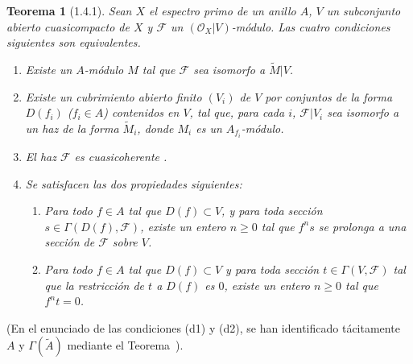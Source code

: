 \documentclass[oneside]{amsart}
\theoremstyle{ega-env-style}
\theoremstyle{ega-thm-env-style}
\newtheorem*{theorem}{Teorema}
\theoremstyle{ega-defn-env-style}
\def\geq{\geqslant}                 %
\let\EGAOriginalLabel\label
\renewcommand{\label}[1]{\phantomsection\EGAOriginalLabel{#1}}
\begin{document}
\begin{theorem}[1.4.1]
\label{I.1.4.1}
Sean $X$ el espectro primo de un anillo $A$, $V$ un subconjunto abierto cuasicompacto de $X$ y $\mathscr{F}$ un $(\mathscr{O}_X|V)$-módulo.
Las cuatro condiciones siguientes son equivalentes.
\begin{enumerate}
  \item[\textup{a)}] Existe un $A$-módulo $M$ tal que $\mathscr{F}$ sea isomorfo a $\widetilde{M}|V$.
  \item[\textup{b)}] Existe un cubrimiento abierto finito $(V_i)$ de $V$ por conjuntos de la forma $D(f_i)$ ($f_i\in A$) contenidos en $V$, tal que, para cada $i$, $\mathscr{F}|V_i$ sea isomorfo a un haz de la forma $\widetilde{M}_i$, donde $M_i$ es un $A_{f_i}$-módulo.
  \item[\textup{c)}] El haz $\mathscr{F}$ es cuasicoherente .
  \item[\textup{d)}] Se satisfacen las dos propiedades siguientes:
    \begin{enumerate}
      \item[\textup{d\,1)}] Para todo $f\in A$ tal que $D(f)\subset V$, y para toda sección $s\in\Gamma(D(f),\mathscr{F})$, existe un entero $n\geq0$ tal que $f^n s$ se prolonga a una sección de $\mathscr{F}$ sobre $V$.
      \item[\textup{d\,2)}] Para todo $f\in A$ tal que $D(f)\subset V$ y para toda sección $t\in\Gamma(V,\mathscr{F})$ tal que la restricción de $t$ a $D(f)$ es $0$, existe un entero $n\geq0$ tal que $f^n t=0$.
    \end{enumerate}
\end{enumerate}
\end{theorem}
(En el enunciado de las condiciones (d1) y (d2), se han identificado tácitamente $A$ y $\Gamma(\widetilde{A})$ mediante el Teorema~).
\end{document}

